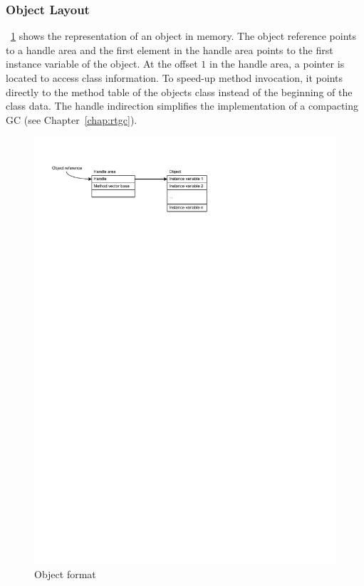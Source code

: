 \subsubsection{Object Layout}


\figurename~\ref{fig_jvm_object} shows the representation of an
object in memory. The object reference points to a handle area and
the first element in the handle area points to the first instance
variable of the object. At the offset $1$ in the handle area, a
pointer is located to access class information. To speed-up method
invocation, it points directly to the method table of the objects
class instead of the beginning of the class data. The handle
indirection simplifies the implementation of a compacting GC (see
Chapter~\ref{chap:rtgc}).


\begin{figure}
    \centering
    \includegraphics[scale=\picscale]{jvm/jvm_object}
    \caption{Object format}
    \label{fig_jvm_object}
\end{figure}

